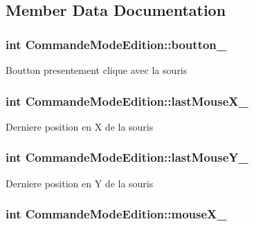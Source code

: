 \subsection{Member Data Documentation}
\hypertarget{class_commande_mode_edition_a84e2d980201bc0649b2af9c9f4bff7e6}{
\subsubsection[{boutton\-\_\-}]{\setlength{\rightskip}{0pt plus 5cm}int Commande\-Mode\-Edition\-::boutton\-\_\-\hspace{0.3cm}{\ttfamily [protected]}}}\label{class_commande_mode_edition_a84e2d980201bc0649b2af9c9f4bff7e6}
Boutton presentement clique avec la souris \hypertarget{class_commande_mode_edition_a02fd21f564101674d5c8af535322ea02}{
\subsubsection[{last\-Mouse\-X\-\_\-}]{\setlength{\rightskip}{0pt plus 5cm}int Commande\-Mode\-Edition\-::last\-Mouse\-X\-\_\-\hspace{0.3cm}{\ttfamily [protected]}}}\label{class_commande_mode_edition_a02fd21f564101674d5c8af535322ea02}
Derniere position en X de la souris \hypertarget{class_commande_mode_edition_a42bd29db98adec623e8c7cd5771783f3}{
\subsubsection[{last\-Mouse\-Y\-\_\-}]{\setlength{\rightskip}{0pt plus 5cm}int Commande\-Mode\-Edition\-::last\-Mouse\-Y\-\_\-\hspace{0.3cm}{\ttfamily [protected]}}}\label{class_commande_mode_edition_a42bd29db98adec623e8c7cd5771783f3}
Derniere position en Y de la souris \hypertarget{class_commande_mode_edition_ade7653be98ae5dd9da895a34983ec680}{
\subsubsection[{mouse\-X\-\_\-}]{\setlength{\rightskip}{0pt plus 5cm}int Commande\-Mode\-Edition\-::mouse\-X\-\_\-\hspace{0.3cm}{\ttfamily [protected]}}}\label{class_commande_mode_edition_ade7653be98ae5dd9da895a34983ec680}
